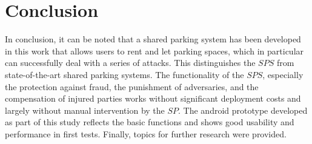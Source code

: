 \chapter{Conclusion}
\label{ch:Conclusion}
In conclusion, it can be noted that a shared parking system has been developed in this work that allows users to rent and let parking spaces, which in particular can successfully deal with a series of attacks. This distinguishes the $SPS$ from state-of-the-art shared parking systems. The functionality of the $SPS$, especially the protection against fraud, the punishment of adversaries, and the compensation of injured parties works without significant deployment costs and largely without manual intervention by the $SP$. The android prototype developed as part of this study reflects the basic functions and shows good usability and performance in first tests. Finally, topics for further research were provided.